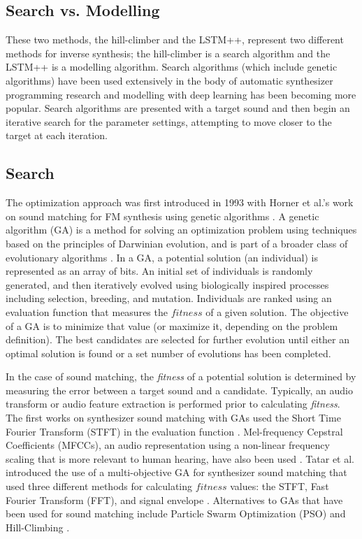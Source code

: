 \subsection{Search vs. Modelling}
These two methods, the hill-climber and the LSTM++, represent two different methods for inverse synthesis; the hill-climber is a search algorithm and the LSTM++ is a modelling algorithm. Search algorithms (which include genetic algorithms) have been used extensively in the body of automatic synthesizer programming research and modelling with deep learning has been becoming more popular. Search algorithms are presented with a target sound and then begin an iterative search for the parameter settings, attempting to move closer to the target at each iteration.

\subsection{Search}
The optimization approach was first introduced in 1993 with Horner et al.'s work on sound matching for FM synthesis using genetic algorithms \cite{horner1993machine}. A genetic algorithm (GA) is a method for solving an optimization problem using techniques based on the principles of Darwinian evolution, and is part of a broader class of evolutionary algorithms \cite{whitley1994genetic}. In a GA, a potential solution (an individual) is represented as an array of bits. An initial set of individuals is randomly generated, and then iteratively evolved using biologically inspired processes including selection, breeding, and mutation. Individuals are ranked using an evaluation function that measures the $fitness$ of a given solution. The objective of a GA is to minimize that value (or maximize it, depending on the problem definition). The best candidates are selected for further evolution until either an optimal solution is found or a set number of evolutions has been completed.

In the case of sound matching, the \textit{fitness} of a potential solution is determined by measuring the error between a target sound and a candidate. Typically, an audio transform or audio feature extraction is performed prior to calculating \textit{fitness}. The first works on synthesizer sound matching with GAs used the Short Time Fourier Transform (STFT) in the evaluation function \cite{horner1993machine, horner1995wavetable}. Mel-frequency Cepstral Coefficients (MFCCs), an audio representation using a non-linear frequency scaling that is more relevant to human hearing, have also been used \cite{yee2008synthbot, roth2011comparison, macret2014automatic, smith2017play}. Tatar et al. introduced the use of a multi-objective GA for synthesizer sound matching that used three different methods for calculating $fitness$ values: the STFT, Fast Fourier Transform (FFT), and signal envelope \cite{tatar2016automatic}. Alternatives to GAs that have been used for sound matching include Particle Swarm Optimization (PSO) \cite{heise2009automatic} and Hill-Climbing \cite{roth2011comparison, luke2019stochastic}.

